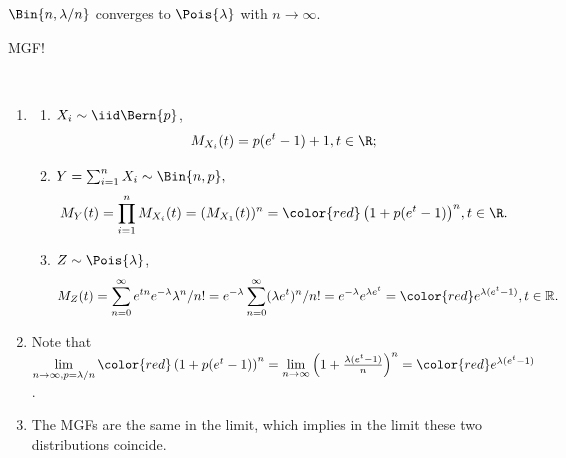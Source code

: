 \begin{exercise} 
 $\Bin{n,\lambda/n}$ converges to $\Pois{\lambda}$ with $n \rightarrow \infty$.	
	\begin{hint}
		MGF! 
	\end{hint}
	\begin{solution}~\\
		\begin{enumerate}		
			\item \begin{enumerate} 
				\item $X_i\sim \iid \Bern{p}$, $$M_{X_i}(t)=p(e^t-1)+1, t\in \R;$$ 
				\item $Y=\sum_{i=1}^{n}X_i\sim \Bin{n,p},$
				$$M_{Y}(t)= \prod_{i=1}^{n}M_{X_i}(t) =(M_{X_1}(t))^n = {\color{red}\left(1+p(e^t-1)\right)^n}, t\in \R.$$ 
				\item[] $Z\sim \Pois{\lambda}$, $$M_{Z}(t)=\sum_{n=0}^\infty e^{tn}e^{-\lambda} \lambda^n/n!=e^{-\lambda} \sum_{n=0}^\infty  (\lambda e^t)^n/n! =e^{-\lambda}e^{\lambda e^t}    = {\color{red}e^{\lambda (e^t-1) }}, t\in \mathbb{R}.$$
			\end{enumerate}
			\item Note that $\lim\limits_{n\rightarrow \infty, p=\lambda/n}{\color{red}\left(1+p(e^t-1)\right)^n}= \lim\limits_{n\rightarrow \infty}\left(1+ \frac{\lambda(e^t-1)}{n}\right)^n=  {\color{red}e^{\lambda (e^t-1) }}$.
			\item{ The MGFs are the same in the limit}, which implies in the limit these two distributions coincide.
		\end{enumerate}~\\
	\end{solution}
\end{exercise}

